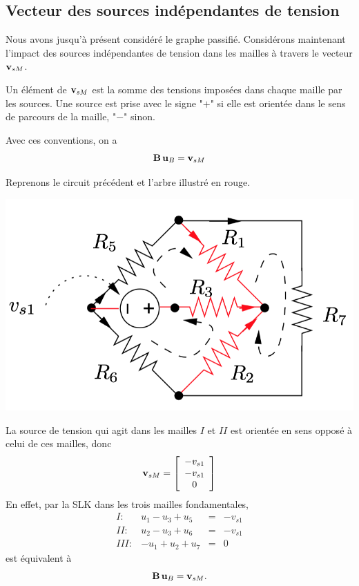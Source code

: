 \subsection{Vecteur des sources indépendantes de tension} Nous avons jusqu'à présent considéré le graphe passifié. Considérons maintenant l'impact des sources indépendantes de tension dans les mailles à travers le vecteur ${\bf v}_{sM}$. 

Un élément de ${\bf v}_{sM}$ est la  somme des tensions imposées dans chaque maille par les sources. Une source est prise avec le signe "$+$" si elle est orientée dans le sens de parcours de la maille, "$-$" sinon. 

Avec ces conventions, on a 
$${\bf B}\,{\bf u}_B = {\bf v}_{sM}$$

\begin{testexample}
	Reprenons le circuit précédent et l'arbre illustré en rouge.
	\begin{center}
	\includegraphics[width=0.5\linewidth]{figs/methodes-generales/m_mailles_3}
	\end{center}
	 La source de tension qui agit dans les mailles $I$ et $II$ est orientée en sens opposé à celui de ces mailles, donc  
	\[ {\bf v}_{sM} = 
	\left[
	\begin{array}{c}
	-v_{s1}\\
	-v_{s1}\\
	0
	\end{array} \right] \]
	En effet, par la SLK dans les trois mailles fondamentales, 
	\[\begin{array}{lrcl}
	I : & u_1-u_3+u_5 & = & -v_{s1}\\
	II : & u_2-u_3+u_6 & = & -v_{s1}\\
	III : & -u_1+u_2+u_7 & = & 0
	\end{array}
	\] est équivalent à  $${\bf B}\,{\bf u}_B = {\bf v}_{sM}.$$ 
\end{testexample}

